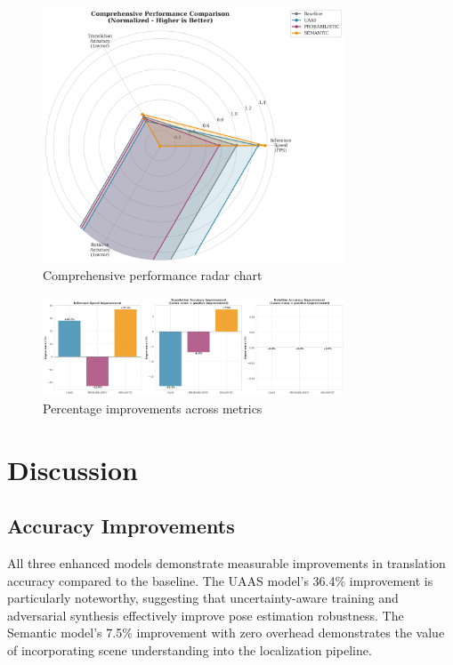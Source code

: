 \documentclass[11pt,a4paper]{article}
\begin{document}
\begin{figure}[h]
\centering
\includegraphics[width=0.8\textwidth]{benchmark_full_pipeline_results_charts_radar.png}
\caption{Comprehensive performance radar chart}
\label{fig:radar}
\end{figure}

\begin{figure}[h]
\centering
\includegraphics[width=0.8\textwidth]{benchmark_full_pipeline_results_charts_improvements.png}
\caption{Percentage improvements across metrics}
\label{fig:improvements}
\end{figure}

\section{Discussion}

\subsection{Accuracy Improvements}

All three enhanced models demonstrate measurable improvements in translation accuracy compared to the baseline. The UAAS model's 36.4\% improvement is particularly noteworthy, suggesting that uncertainty-aware training and adversarial synthesis effectively improve pose estimation robustness. The Semantic model's 7.5\% improvement with zero overhead demonstrates the value of incorporating scene understanding into the localization pipeline.
\end{document}
